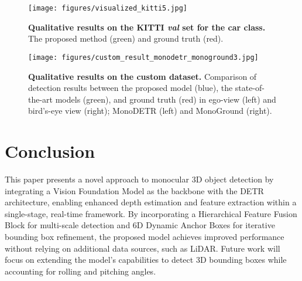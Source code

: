 \begin{figure*}[h]
    \centering
    \texttt{[image: figures/visualized\_kitti5.jpg]}
    \caption[Qualitative Results on KITTI \textit{val.} set]{\textbf{Qualitative results on the KITTI \textit{val} set for the car class.} The proposed method (green) and ground truth (red).
    } \label{fig:KITTI visualized}
\end{figure*}

\begin{figure*}[t]
    \centering
     \texttt{[image: figures/custom\_result\_monodetr\_monoground3.jpg]}
    \caption{\textbf{Qualitative results on the custom dataset.} Comparison of detection results between the proposed model (blue), the state-of-the-art models (green), and ground truth (red) in ego-view (left) and bird's-eye view (right); MonoDETR (left) and MonoGround (right).}
    \label{fig:custom_result_visualized}
\end{figure*}

\section{Conclusion}
\label{sec:conclusion}
This paper presents a novel approach to monocular 3D object detection by integrating a Vision Foundation Model as the backbone with the DETR architecture, enabling enhanced depth estimation and feature extraction within a single-stage, real-time framework. By incorporating a Hierarchical Feature Fusion Block for multi-scale detection and 6D Dynamic Anchor Boxes for iterative bounding box refinement, the proposed model achieves improved performance without relying on additional data sources, such as LiDAR. Future work will focus on extending the model's capabilities to detect 3D bounding boxes while accounting for rolling and pitching angles.